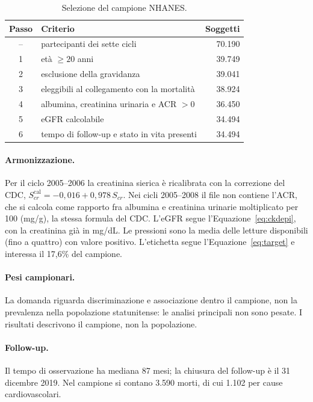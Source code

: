 \documentclass[a4paper, 12pt, oneside]{book}
\begin{document}
\begin{table}[H]
	\centering
	\small
	\caption{Selezione del campione NHANES.}
	\label{tab:nhanes-inclusione}
	\begin{tabular}{@{}clr@{}}
		\toprule
		Passo & Criterio & Soggetti \\
		\midrule
		-- & partecipanti dei sette cicli & 70.190 \\
		1 & età $\geq 20$ anni & 39.749 \\
		2 & esclusione della gravidanza & 39.041 \\
		3 & eleggibili al collegamento con la mortalità & 38.924 \\
		4 & albumina, creatinina urinaria e ACR $>0$ & 36.450 \\
		5 & eGFR calcolabile & 34.494 \\
		6 & tempo di follow-up e stato in vita presenti & 34.494 \\
		\bottomrule
	\end{tabular}
\end{table}

\paragraph{Armonizzazione.} Per il ciclo 2005--2006 la creatinina sierica è ricalibrata con la correzione del CDC, $S_{cr}^{\mathrm{cal}} = -0{,}016 + 0{,}978\,S_{cr}$. Nei cicli 2005--2008 il file non contiene l'ACR, che si calcola come rapporto fra albumina e creatinina urinarie moltiplicato per 100 (mg/g), la stessa formula del CDC. L'eGFR segue l'Equazione~\eqref{eq:ckdepi}, con la creatinina già in mg/dL. Le pressioni sono la media delle letture disponibili (fino a quattro) con valore positivo. L'etichetta segue l'Equazione~\eqref{eq:target} e interessa il 17,6\% del campione.

\paragraph{Pesi campionari.} La domanda riguarda discriminazione e associazione dentro il campione, non la prevalenza nella popolazione statunitense: le analisi principali non sono pesate. I risultati descrivono il campione, non la popolazione.

\paragraph{Follow-up.} Il tempo di osservazione ha mediana 87 mesi; la chiusura del follow-up è il 31 dicembre 2019. Nel campione si contano 3.590 morti, di cui 1.102 per cause cardiovascolari.
\end{document}
